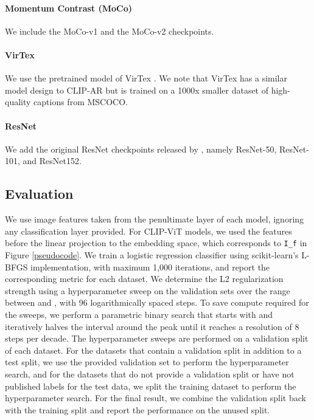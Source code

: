 \documentclass{article}
\begin{document}
\paragraph{Momentum Contrast (MoCo)} We include the MoCo-v1 \citep{he2020moco} and the MoCo-v2 \cite{chen2020mocov2} checkpoints.
\paragraph{VirTex} We use the pretrained model of VirTex \citep{desai2020virtex}. We note that VirTex has a similar model design to CLIP-AR but is trained on a 1000x smaller dataset of high-quality captions from MSCOCO.
\paragraph{ResNet} We add the original ResNet checkpoints released by \cite{he2016resnet}, namely ResNet-50, ResNet-101, and ResNet152.


\subsection{Evaluation}

We use image features taken from the penultimate layer of each model, ignoring any classification layer provided.
For CLIP-ViT models, we used the features before the linear projection to the embedding space, which corresponds to \texttt{I\_f} in Figure \ref{pseudocode}.
We train a logistic regression classifier using scikit-learn's L-BFGS implementation, with maximum 1,000 iterations, and report the corresponding metric for each dataset. We determine the L2 regularization strength  using a hyperparameter sweep on the validation sets over the range between  and , with 96 logarithmically spaced steps. To save compute required for the sweeps, we perform a parametric binary search that starts with  and iteratively halves the interval around the peak until it reaches a resolution of 8 steps per decade. The hyperparameter sweeps are performed on a validation split of each dataset. For the datasets that contain a validation split in addition to a test split, we use the provided validation set to perform the hyperparameter search, and for the datasets that do not provide a validation split or have not published labels for the test data, we split the training dataset to perform the hyperparameter search. For the final result, we combine the validation split back with the training split and report the performance on the unused split.
\end{document}
